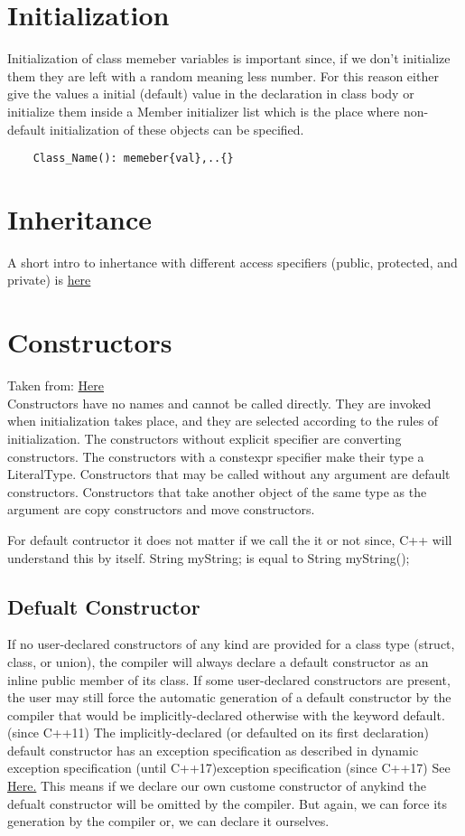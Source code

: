 \documentclass[11pt,twoside,a4paper]{report}
\begin{document}
\section{Initialization}
Initialization of class memeber variables is important since, if we don't initialize them they are left with a random meaning less number. For this reason either give the values a initial (default) value in the declaration in class body
or initialize them inside a Member initializer list which is the place where non-default initialization of these objects can be specified.
\begin{lstlisting}
    Class_Name(): memeber{val},..{}
\end{lstlisting}

\section{Inheritance}
A short intro to inhertance with different access specifiers (public, protected, and private) is \href{https://www.tutorialspoint.com/cplusplus/cpp_inheritance.htm}{here}

\section{Constructors}
Taken from: \href{https://en.cppreference.com/w/cpp/language/constructor}{Here} \\
Constructors have no names and cannot be called directly. They are invoked when initialization takes place, and they are selected according to 
the rules of initialization. The constructors without explicit specifier are converting constructors. The constructors with a constexpr specifier 
make their type a LiteralType. Constructors that may be called without any argument are default constructors. Constructors that take another object of the same type as the argument are copy constructors and move constructors. 

For default contructor it does not matter if we call the it or not since, C++ will understand this by itself.
String myString; is equal to String myString();

\subsection{Defualt Constructor}
If no user-declared constructors of any kind are provided for a class type (struct, class, or union), the compiler will always declare a default constructor as an inline public member of its class.
If some user-declared constructors are present, the user may still force the automatic generation of a default constructor by the compiler that would be implicitly-declared otherwise with the keyword default. (since C++11)
The implicitly-declared (or defaulted on its first declaration) default constructor has an exception specification as described in dynamic exception specification (until C++17)exception specification (since C++17)
See \href{https://en.cppreference.com/w/cpp/language/default_constructor}{Here.}
This means if we declare our own custome constructor of anykind the defualt constructor will be omitted by the compiler. But again, we can force its generation by the compiler or, we can declare it ourselves.
\end{document}
